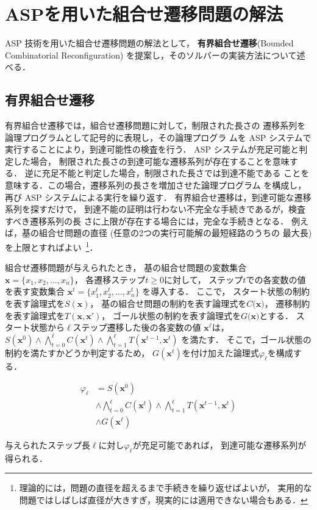 ﻿%
\section{ASPを用いた組合せ遷移問題の解法}\label{chap:proposal}

ASP 技術を用いた組合せ遷移問題の解法として，
\textbf{有界組合せ遷移}(Bounded Combinatorial Reconfiguration)
を提案し，そのソルバーの実装方法について述べる．

\subsection{有界組合せ遷移}

有界組合せ遷移では，組合せ遷移問題に対して，制限された長さの
遷移系列を論理プログラムとして記号的に表現し，その論理プログラ
ムを ASP システムで実行することにより，到達可能性の検査を行う．
ASP システムが充足可能と判定した場合，
制限された長さの到達可能な遷移系列が存在することを意味する．
逆に充足不能と判定した場合，制限された長さでは到達不能である
ことを意味する．この場合，遷移系列の長さを増加させた論理プログラム
を構成し，再び ASP システムによる実行を繰り返す．
有界組合せ遷移は，到達可能な遷移系列を探すだけで，
到達不能の証明は行わない不完全な手続きであるが，検査すべき遷移系列の長
さに上限が存在する場合には，完全な手続きとなる．
例えば，基の組合せ問題の直径 (任意の2つの実行可能解の最短経路のうちの
最大長)を上限とすればよい~\footnote{%
理論的には，問題の直径を超えるまで手続きを繰り返せばよいが，
実用的な問題ではしばしば直径が大きすぎ，現実的には適用できない場合もある．}．

組合せ遷移問題が与えられたとき，
基の組合せ問題の変数集合
$\bm{x} = \{x_1,x_2,\ldots,x_n\}$，
各遷移ステップ$t\geq 0$に対して，
ステップ$t$での各変数の値を表す変数集合
$\bm{x}^{t} = \{x_1^t,x_2^t,\ldots,x_n^t\}$
を導入する．
ここで，
スタート状態の制約を表す論理式を$S(\bm{x})$，
基の組合せ問題の制約を表す論理式を$C(\bm{x)}$，
遷移制約を表す論理式を$T(\bm{x},\bm{x}')$，
ゴール状態の制約を表す論理式を$G(\bm{x)}$とする．
スタート状態から$\ell$ステップ遷移した後の各変数の値
$\bm{x}^{\ell}$は，
\(
S(\bm{x}^0) \land 
\bigwedge_{t=0}^{\ell} C(\bm{x}^t) \land
\bigwedge_{t=1}^{\ell} T(\bm{x}^{t-1},\bm{x}^{t})
\)
を満たす．
そこで，ゴール状態の制約を満たすかどうか判定するため，
$G(\bm{x}^\ell)$を付け加えた論理式$\varphi_{\ell}$を構成する．
\begin{adjustvboxheight}
\begin{align*}
  \varphi_{\ell} &= S(\bm{x}^0) \nonumber\\
  &\land \bigwedge_{t=0}^{\ell} C(\bm{x}^t) 
  \land \bigwedge_{t=1}^{\ell} T(\bm{x}^{t-1},\bm{x}^{t}) \label{BoCoRe:phi}\\
  &\land G(\bm{x}^\ell) \nonumber
\end{align*}
\end{adjustvboxheight}
与えられたステップ長$\ell$に対し$\varphi_\ell$が充足可能であれば，
到達可能な遷移系列が得られる．


